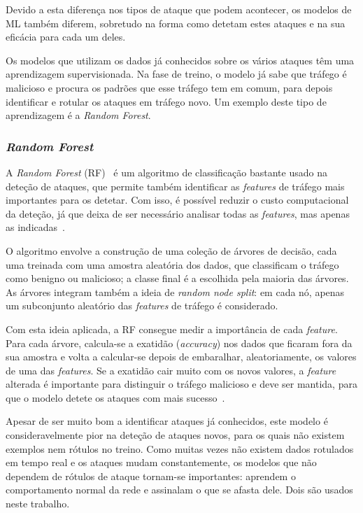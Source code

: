 \documentclass[conference,a4paper]{IEEEtran}
\begin{document}
Devido a esta diferença nos tipos de ataque que podem acontecer, os modelos de ML também
diferem, sobretudo na forma como detetam estes ataques e na sua eficácia para cada um
deles.

Os modelos que utilizam os dados já conhecidos sobre os vários ataques têm uma
aprendizagem supervisionada. Na fase de treino, o modelo já sabe que tráfego é malicioso
e procura os padrões que esse tráfego tem em comum, para depois identificar e rotular
os ataques em tráfego novo. Um exemplo deste tipo de aprendizagem é a \textit{Random
Forest}.

\subsubsection{\textit{Random Forest}}
A \textit{Random Forest} (RF)~\cite{breiman2001random} é um algoritmo de classificação
bastante usado na deteção de ataques, que permite também identificar as
\textit{features} de tráfego mais importantes para os detetar. Com isso, é possível
reduzir o custo computacional da deteção, já que deixa de ser necessário analisar todas
as \textit{features}, mas apenas as indicadas~\cite{Iranzad2025}.

O algoritmo envolve a construção de uma coleção de árvores de decisão, cada uma treinada
com uma amostra aleatória dos dados, que classificam o tráfego como benigno ou
malicioso; a classe final é a escolhida pela maioria das árvores. As árvores integram
também a ideia de \textit{random node split}: em cada nó, apenas um subconjunto
aleatório das \textit{features} de tráfego é considerado.

Com esta ideia aplicada, a RF consegue medir a importância de cada \textit{feature}. Para
cada árvore, calcula-se a exatidão (\textit{accuracy}) nos dados que ficaram fora da sua
amostra e volta a calcular-se depois de embaralhar, aleatoriamente, os valores de uma das
\textit{features}. Se a exatidão cair muito com os novos valores, a \textit{feature}
alterada é importante para distinguir o tráfego malicioso e deve ser mantida, para que o
modelo detete os ataques com mais sucesso~\cite{breiman2001random,Iranzad2025}.

Apesar de ser muito bom a identificar ataques já conhecidos, este modelo é
consideravelmente pior na deteção de ataques novos, para os quais não existem exemplos
nem rótulos no treino. Como muitas vezes não existem dados rotulados em tempo real e os
ataques mudam constantemente, os modelos que não dependem de rótulos de ataque tornam-se
importantes: aprendem o comportamento normal da rede e assinalam o que se afasta dele.
Dois são usados neste trabalho.
\end{document}
